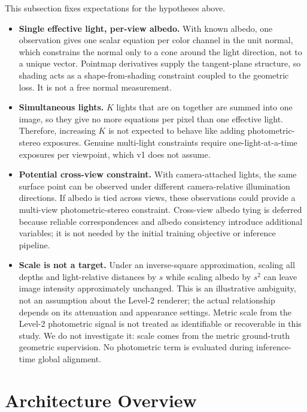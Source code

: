\documentclass[11pt,a4paper]{article}
\begin{document}
This subsection fixes expectations for the hypotheses above.
\begin{itemize}
  \item \textbf{Single effective light, per-view albedo.} With known
  albedo, one observation gives one scalar equation per color channel in
  the unit normal, which constrains the normal only to a cone around the
  light direction, not to a unique vector. Pointmap derivatives supply the
  tangent-plane structure, so shading acts as a shape-from-shading
  constraint coupled to the geometric loss. It is not a free normal
  measurement.
  \item \textbf{Simultaneous lights.} $K$ lights that are on together are
  summed into one image, so they give no more equations per pixel than one
  effective light. Therefore, increasing $K$ is not expected to behave
  like adding photometric-stereo exposures. Genuine multi-light constraints
  require one-light-at-a-time exposures per viewpoint, which v1 does not
  assume.
  \item \textbf{Potential cross-view constraint.} With camera-attached
  lights, the same surface point can be observed under different
  camera-relative illumination directions. If albedo is tied across views,
  these observations could provide a multi-view photometric-stereo constraint.
  Cross-view albedo tying is deferred because reliable correspondences and
  albedo consistency introduce additional variables; it is not needed by the
  initial training objective or inference pipeline.
  \item \textbf{Scale is not a target.} Under an inverse-square approximation, scaling all depths and
  light-relative distances by $s$ while scaling albedo by $s^2$ can leave
  image intensity approximately unchanged. This is an illustrative
  ambiguity, not an assumption about the Level-2 renderer; the actual
  relationship depends on its attenuation and appearance settings.
  Metric scale from the Level-2 photometric signal is not treated as
  identifiable or recoverable in this study. We do not investigate it: scale comes from the metric
  ground-truth geometric supervision. No photometric term is evaluated
  during inference-time global alignment.
\end{itemize}

\section{Architecture Overview}
\end{document}
